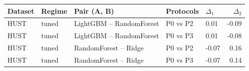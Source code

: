 \begin{tabular}{lllllr}
\toprule
Dataset & Regime & Pair (A, B) & Protocols & $\Delta_1$ & $\Delta_2$ \\
\midrule
HUST & tuned & LightGBM -- RandomForest & P0 vs P2 & 0.01 & -0.09 \\
HUST & tuned & LightGBM -- RandomForest & P0 vs P3 & 0.01 & -0.08 \\
HUST & tuned & RandomForest -- Ridge & P0 vs P2 & -0.07 & 0.16 \\
HUST & tuned & RandomForest -- Ridge & P0 vs P3 & -0.07 & 0.14 \\
\bottomrule
\end{tabular}
